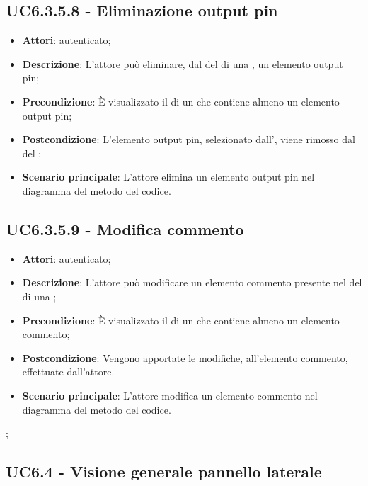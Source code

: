 \subsection{UC6.3.5.8 - Eliminazione output pin}
\label{ssec:UC6.3.5.8}
\begin{itemize}
\item \textbf{Attori}:  autenticato;
\item \textbf{Descrizione}: L'attore può eliminare, dal  del  di una , un elemento output pin;
\item \textbf{Precondizione}: È visualizzato il  di un  che contiene almeno un elemento output pin;
\item \textbf{Postcondizione}: L'elemento output pin, selezionato dall', viene rimosso dal  del ;
\item \textbf{Scenario principale}: L'attore elimina un elemento output pin nel diagramma del metodo del codice.
\end{itemize}
\subsection{UC6.3.5.9 - Modifica commento}
\label{ssec:UC6.3.5.9}
\begin{itemize}
\item \textbf{Attori}:  autenticato;
\item \textbf{Descrizione}: L'attore può modificare un elemento commento presente nel  del  di una ;
\item \textbf{Precondizione}: È visualizzato il  di un  che contiene almeno un elemento commento;
\item \textbf{Postcondizione}: Vengono apportate le modifiche, all'elemento commento, effettuate dall'attore.
\item \textbf{Scenario principale}: L'attore modifica un elemento commento nel diagramma del metodo del codice.
\end{itemize};
\newpage
\subsection{UC6.4 - Visione generale pannello laterale}
\label{ssec:UC6.4}


